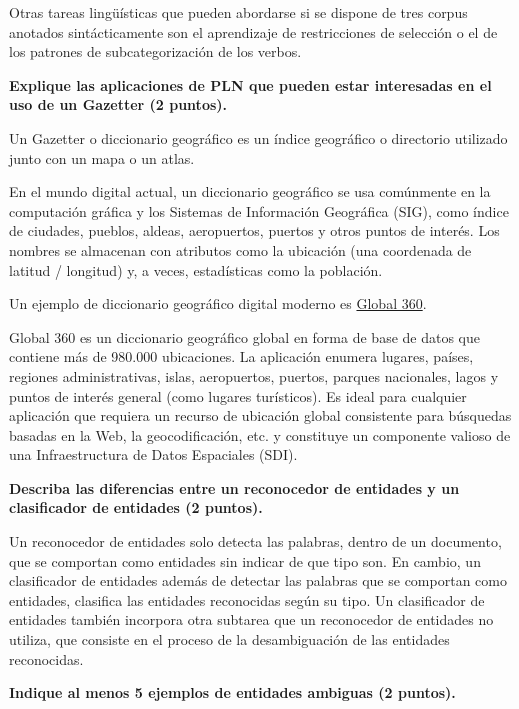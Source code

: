 \documentclass[11pt]{exam}
\begin{document}
\begin{questions}
Otras tareas lingüísticas que pueden abordarse si se dispone de tres corpus anotados sintácticamente son el aprendizaje de restricciones de selección o el de los patrones de subcategorización de los verbos.


{\bf \question Explique las aplicaciones de PLN que pueden estar interesadas en el uso de un Gazetter (2 puntos).}

Un Gazetter o diccionario geográfico es un índice geográfico o directorio utilizado junto con un mapa o un atlas.

En el mundo digital actual, un diccionario geográfico se usa comúnmente en la computación gráfica y los Sistemas de Información Geográfica (SIG), como índice de ciudades, pueblos, aldeas, aeropuertos, puertos y otros puntos de interés. Los nombres se almacenan con atributos como la ubicación (una coordenada de latitud / longitud) y, a veces, estadísticas como la población.

Un ejemplo de diccionario geográfico digital moderno es \href{https://www.europa.uk.com/map-data/global/global-360/}{Global 360}.

Global 360 es un diccionario geográfico global en forma de base de datos que contiene más de 980.000 ubicaciones. La aplicación enumera lugares, países, regiones administrativas, islas, aeropuertos, puertos, parques nacionales, lagos y puntos de interés general (como lugares turísticos). Es ideal para cualquier aplicación que requiera un recurso de ubicación global consistente para búsquedas basadas en la Web, la geocodificación, etc. y constituye un componente valioso de una Infraestructura de Datos Espaciales (SDI). 

{\bf \question Describa las diferencias entre un reconocedor de entidades y un clasificador de entidades (2 puntos).}

Un reconocedor de entidades solo detecta las palabras, dentro de un documento, que se comportan como entidades sin indicar de que tipo son. En cambio, un clasificador de entidades además de detectar las palabras que se comportan como entidades, clasifica las entidades reconocidas según su tipo. Un clasificador de entidades también incorpora otra subtarea que un reconocedor de entidades no utiliza, que consiste en el proceso de la desambiguación de las entidades reconocidas.

{\bf \question Indique al menos 5 ejemplos de entidades ambiguas (2 puntos).}


\end{questions}
\end{document}
